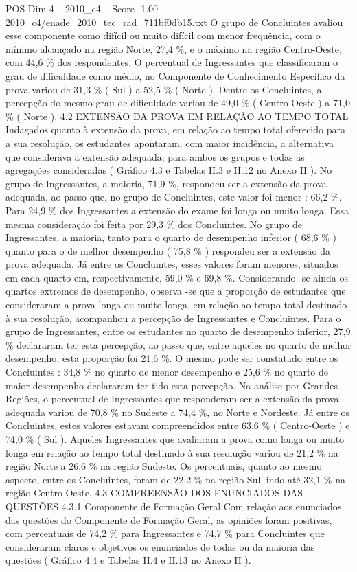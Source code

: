 \begin{textsample}{POS Dim 4 – 2010\_c4 – Score -1.00 – 2010\_c4/enade\_2010\_tec\_rad\_711bf0db15.txt}
O grupo de Concluintes avaliou esse componente como difícil ou muito difícil com menor frequência, com o mínimo alcançado na região Norte, 27,4 \%, e o máximo na região Centro-Oeste, com 44,6 \% dos respondentes.
O percentual de Ingressantes que classificaram o grau de dificuldade como médio, no Componente de Conhecimento Específico da prova variou de 31,3 \% ( Sul ) a 52,5 \% ( Norte ).
Dentre os Concluintes, a percepção do mesmo grau de dificuldade variou de 49,0 \% ( Centro-Oeste ) a 71,0 \% ( Norte ). 4.2 EXTENSÃO DA PROVA EM RELAÇÃO AO TEMPO TOTAL Indagados quanto à extensão da prova, em relação ao tempo total oferecido para a sua resolução, os estudantes apontaram, com maior incidência, a alternativa que considerava a extensão adequada, para ambos os grupos e todas as agregações consideradas ( Gráfico 4.3 e Tabelas II.3 e II.12 no Anexo II ).
No grupo de Ingressantes, a maioria, 71,9 \%, respondeu ser a extensão da prova adequada, ao passo que, no grupo de Concluintes, este valor foi menor : 66,2 \%.
Para 24,9 \% dos Ingressantes a extensão do exame foi longa ou muito longa.
Essa mesma consideração foi feita por 29,3 \% dos Concluintes.
No grupo de Ingressantes, a maioria, tanto para o quarto de desempenho inferior ( 68,6 \% ) quanto para o de melhor desempenho ( 75,8 \% ) respondeu ser a extensão da prova adequada.
Já entre os Concluintes, esses valores foram menores, situados em cada quarto em, respectivamente, 59,0 \% e 69,8 \%.
Considerando -se ainda os quartos extremos de desempenho, observa -se que a proporção de estudantes que consideraram a prova longa ou muito longa, em relação ao tempo total destinado à sua resolução, acompanhou a percepção de Ingressantes e Concluintes.
Para o grupo de Ingressantes, entre os estudantes no quarto de desempenho inferior, 27,9 \% declararam ter esta percepção, ao passo que, entre aqueles no quarto de melhor desempenho, esta proporção foi 21,6 \%.
O mesmo pode ser constatado entre os Concluintes : 34,8 \% no quarto de menor desempenho e 25,6 \% no quarto de maior desempenho declararam ter tido esta percepção.
Na análise por Grandes Regiões, o percentual de Ingressantes que responderam ser a extensão da prova adequada variou de 70,8 \% no Sudeste a 74,4 \%, no Norte e Nordeste.
Já entre os Concluintes, estes valores estavam compreendidos entre 63,6 \% ( Centro-Oeste ) e 74,0 \% ( Sul ).
Aqueles Ingressantes que avaliaram a prova como longa ou muito longa em relação ao tempo total destinado à sua resolução variou de 21,2 \% na região Norte a 26,6 \% na região Sudeste.
Os percentuais, quanto ao mesmo aspecto, entre os Concluintes, foram de 22,2 \% na região Sul, indo até 32,1 \% na região Centro-Oeste. 4.3 COMPREENSÃO DOS ENUNCIADOS DAS QUESTÕES 4.3.1 Componente de Formação Geral Com relação aos enunciados das questões do Componente de Formação Geral, as opiniões foram positivas, com percentuais de 74,2 \% para Ingressantes e 74,7 \% para Concluintes que consideraram claros e objetivos os enunciados de todas ou da maioria das questões ( Gráfico 4.4 e Tabelas II.4 e II.13 no Anexo II ).

\end{textsample}
